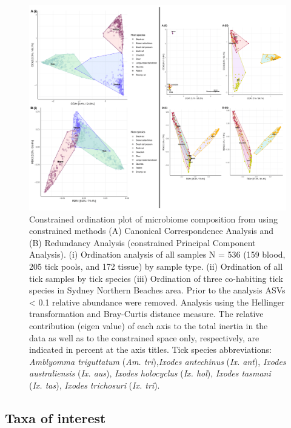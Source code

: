 \documentclass[a4paper, nobind]{templates/ociamthesis}
\begin{document}
\begin{figure}
\includegraphics[width=0.95\linewidth]{figures/ms-figs/Ch3-ord_combine} \caption[Constrained ordination plot of microbiome composition from wildlife blood, tissue and ticks.]{Constrained ordination plot of microbiome composition from using constrained methods (A) Canonical Correspondence Analysis and (B) Redundancy Analysis (constrained Principal Component Analysis). (i) Ordination analysis of all samples N = 536 (159 blood, 205 tick pools, and 172 tissue) by sample type. (ii) Ordination of all tick samples by tick species (iii) Ordination of three co-habiting tick species in Sydney Northern Beaches area. Prior to the analysis ASVs < 0.1 relative abundance were removed. Analysis using the Hellinger transformation and Bray-Curtis distance measure. The relative contribution (eigen value) of each axis to the total inertia in the data as well as to the constrained space only, respectively, are indicated in percent at the axis titles. Tick species abbreviations: \textit{Amblyomma triguttatum} (\textit{Am. tri}),\textit{Ixodes antechinus} (\textit{Ix. ant}), \textit{Ixodes australiensis} (\textit{Ix. aus}), \textit{Ixodes holocyclus} (\textit{Ix. hol}), \textit{Ixodes tasmani} (\textit{Ix. tas}), \textit{Ixodes trichosuri} (\textit{Ix. tri}).}\label{fig:F3ord}
\end{figure}

\hypertarget{taxa-of-interest}{%
\subsection{Taxa of interest}\label{taxa-of-interest}}
\end{document}
